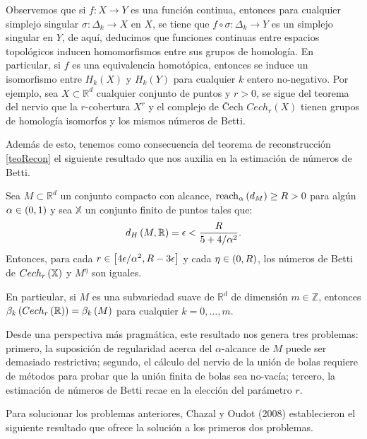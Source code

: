 Observemos que si $f:X\rightarrow Y$ es una funci\'on continua, entonces para cualquier simplejo singular
$\sigma:\Delta_{k}\rightarrow X$ en $X$, se tiene que $f\circ\sigma:\Delta_{k}\rightarrow Y$ es un
simplejo singular en $Y$, de aqu\'i, deducimos que funciones continuas entre espacios topol\'ogicos
inducen homomorfismos entre sus grupos de homolog\'ia. En particular, si $f$ es una equivalencia
homot\'opica, entonces se induce un isomorfismo entre $H_{k}\left(X\right)$ y $H_{k}\left(Y\right)$ para
cualquier $k$ entero no-negativo. Por ejemplo, sea $X\subset \mathbb{R}^{d}$ cualquier conjunto de puntos
y $r>0$, se sigue del teorema del nervio que la $r$-cobertura $X^{r}$ y el complejo de \v Cech
$Cech_{r}\left(X\right)$ tienen grupos de homolog\'ia isomorfos y los mismos n\'umeros de Betti.


Adem\'as de esto, tenemos como consecuencia del teorema de reconstrucci\'on \ref{teoRecon} el siguiente
resultado que nos auxilia en la estimaci\'on de n\'umeros de Betti.

\begin{teorema}
    Sea $M \subset \mathbb{R}^{d}$ un conjunto compacto con alcance,
    $\mathrm{reach}_{\alpha}\left(d_{M}\right)\geq R > 0$ para alg\'un $\alpha\in\left(0, 1\right)$ y sea $\mathbb{X}$
    un conjunto finito de puntos tales que:
    \begin{equation*}
        d_{H}\left(M, \mathbb{R}\right)=\epsilon < \frac{R}{5+4/\alpha^{2}}.
    \end{equation*}
    Entonces, para cada $r\in\left[4\epsilon/\alpha^{2}, R-3\epsilon\right]$ y cada $\eta\in\left(0, R\right)$,
    los n\'umeros de Betti de $Cech_{r}\left(\mathbb{X}\right)$ y $M^{\eta}$ son iguales.
    
    En particular, si $M$ es una subvariedad suave de $\mathbb{R}^{d}$ de dimensi\'on $m\in\mathbb{Z}$,
    entonces $\beta_{k}\left(Cech_{r}\left(\mathbb{R}\right)\right)=\beta_{k}\left(M\right)$ para cualquier $k=0, \dots, m$.
\end{teorema}

Desde una perspectiva m\'as pragm\'atica, este resultado nos genera tres problemas: primero, la
suposici\'on de regularidad acerca del $\alpha$-alcance de $M$ puede ser demasiado restrictiva; segundo,
el c\'alculo del nervio de la uni\'on de bolas requiere de m\'etodos para probar que la uni\'on finita de
bolas sea no-vac\'ia; tercero, la estimaci\'on de n\'umeros de Betti recae en la elecci\'on del
par\'ametro $r$.

Para solucionar los problemas anteriores, Chazal y Oudot (2008) \cite{Chazaloudot2008} establecieron el
siguiente resultado que ofrece la soluci\'on a los primeros dos problemas.

